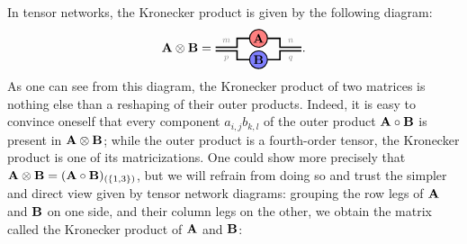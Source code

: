 In tensor networks, the Kronecker product is given by the following diagram:
\begin{align}
    \Ab\kron\Bb = 
\begin{tikzpicture}[baseline=-0.5ex]
    \tikzset{tensor/.style = {minimum size = 0.5cm,shape = circle,thick,draw=black,inner sep = 0pt}, edge/.style   = {thick,line width=.4mm}}
    \def\x{0}
    \def\y{0}
    \node[tensor,fill=red!50!white] (A) at (\x,\y+0.3){$\Ab$};
    \node[tensor,fill=blue!50!white] (B) at (\x,\y-0.3){$\Bb$};
    \draw[edge] (\x-0.25,\y+0.3) -- (\x-0.6,\y+0.3) -- (\x-0.6,\y+0.05)   -- (\x-1.2,\y+0.05) node [midway,above] {\scalebox{0.7}{\dimcolor{$m$}}};
    \draw[edge] (\x-0.25,\y-0.3) -- (\x-0.6,\y-0.3) -- (\x-0.6,\y-0.05) -- (\x-1.2,\y-0.05) node [midway,below] {\scalebox{0.7}{\dimcolor{$p$}}};
    \draw[edge] (\x+0.25,\y+0.3) -- (\x+0.6,\y+0.3) -- (\x+0.6,\y+0.05) -- (\x+1.2,\y+0.05) node [midway,above] {\scalebox{0.7}{\dimcolor{$n$}}};
    \draw[edge] (\x+0.25,\y-0.3) -- (\x+0.6,\y-0.3) -- (\x+0.6,\y-0.05) -- (\x+1.2,\y-0.05) node [midway,below] {\scalebox{0.7}{\dimcolor{$q$}}};
\end{tikzpicture}.
\end{align}
As one can see from this diagram, the Kronecker product of two matrices is nothing else than a reshaping of their outer products. Indeed, it is easy to convince oneself that every component $a_{i,j}b_{k,l}$ of the outer product $\mathbf{A} \circ \mathbf{B}$ is present in $\mathbf{A} \otimes \mathbf{B}$; while the outer product is a fourth-order tensor, the Kronecker product is one of its matricizations. One could show more precisely that $\mathbf{A} \otimes \mathbf{B} = (\mathbf{A} \circ \mathbf{B})_{(\{1,3\})}$, but we will refrain from doing so and trust the simpler and direct view given by tensor network diagrams: grouping the row legs of $\mathbf{A}$ and $\mathbf{B}$ on one side, and their column legs on the other,  we obtain the matrix called the Kronecker product of $\mathbf{A}$ and $\mathbf{B}$:
